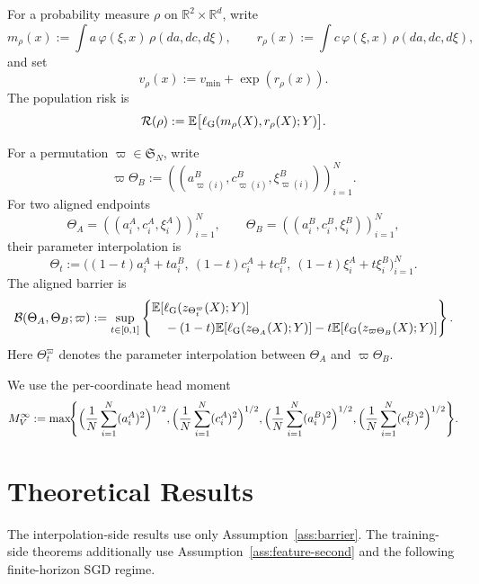 \documentclass[11pt]{article}
\theoremstyle{definition}
\newcommand{\R}{\mathbb{R}}
\newcommand{\E}{\mathbb{E}}
\newcommand{\mc}[1]{\mathcal{#1}}
\newcommand{\cB}{\mathcal{B}}
\begin{document}
For a probability measure $\rho$ on $\R^2\times\R^d$, write
\[
  m_\rho(x)
  :=
  \int a\,\varphi(\xi,x)\,\rho(d a,d c,d\xi),
  \qquad
  r_\rho(x)
  :=
  \int c\,\varphi(\xi,x)\,\rho(d a,d c,d\xi),
\]
and set
\[
  v_\rho(x):=v_{\min}+\exp(r_\rho(x)).
\]
The population risk is
\begin{equation}
  \mc{R}(\rho)
  :=
  \E\bigl[\ell_{\rm G}(m_\rho(X),r_\rho(X);Y)\bigr].
  \label{eq:population-risk}
\end{equation}

For a permutation $\varpi\in\mathfrak{S}_N$, write
\[
  \varpi\Theta_B
  :=
  ((a_{\varpi(i)}^B,c_{\varpi(i)}^B,\xi_{\varpi(i)}^B))_{i=1}^N.
\]
For two aligned endpoints
\[
  \Theta_A=((a_i^A,c_i^A,\xi_i^A))_{i=1}^N,
  \qquad
  \Theta_B=((a_i^B,c_i^B,\xi_i^B))_{i=1}^N,
\]
their parameter interpolation is
\[
  \Theta_t
  :=
  \bigl((1-t)a_i^A+t a_i^B,\ (1-t)c_i^A+t c_i^B,\ (1-t)\xi_i^A+t\xi_i^B\bigr)_{i=1}^N.
\]
The aligned barrier is
\begin{equation}
  \cB(\Theta_A,\Theta_B;\varpi)
  :=
  \sup_{t\in[0,1]}
  \left\{
    \begin{aligned}
      &\E[\ell_{\rm G}(z_{\Theta_t^{\varpi}}(X);Y)]
      \\
      &\quad-
      (1-t)\E[\ell_{\rm G}(z_{\Theta_A}(X);Y)]
      -
      t\E[\ell_{\rm G}(z_{\varpi\Theta_B}(X);Y)]
    \end{aligned}
  \right\}.
  \label{eq:barrier-def}
\end{equation}
Here $\Theta_t^\varpi$ denotes the parameter interpolation between $\Theta_A$
and $\varpi\Theta_B$.

We use the per-coordinate head moment
\begin{equation}
  M_V^\infty
  :=
  \max\!\Biggl\{
    \Bigl(\frac1N\sum_{i=1}^N (a_i^A)^2\Bigr)^{1/2},
    \Bigl(\frac1N\sum_{i=1}^N (c_i^A)^2\Bigr)^{1/2},
    \Bigl(\frac1N\sum_{i=1}^N (a_i^B)^2\Bigr)^{1/2},
    \Bigl(\frac1N\sum_{i=1}^N (c_i^B)^2\Bigr)^{1/2}
  \Biggr\}.
  \label{eq:head-moment}
\end{equation}

\section{Theoretical Results}
\label{sec:theory}

The interpolation-side results use only Assumption~\ref{ass:barrier}. The
training-side theorems additionally use Assumption~\ref{ass:feature-second}
and the following finite-horizon SGD regime.
\end{document}

